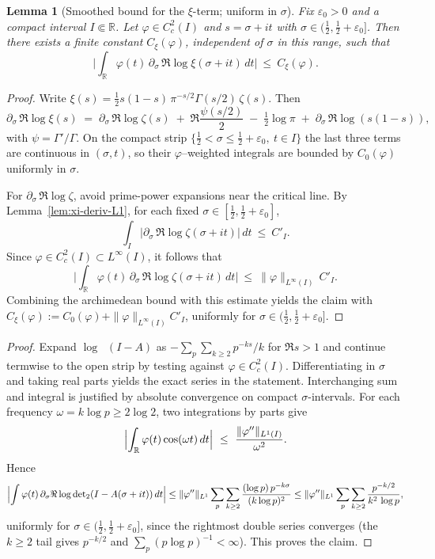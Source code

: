 \documentclass[11pt]{article}
\newtheorem{lemma}[theorem]{Lemma}
\theoremstyle{definition}
\theoremstyle{remark}
\newcommand{\R}{\mathbb{R}}
\DeclareMathOperator{\dettwo}{det_2}
\begin{document}
\begin{lemma}[Smoothed bound for the \(\xi\)-term; uniform in \(\sigma\)]\label{lem:xi-smoothed}
Fix \(\varepsilon_0>0\) and a compact interval \(I\Subset\R\). Let \(\varphi\in C_c^2(I)\) and \(s=\sigma+it\) with \(\sigma\in(\tfrac12,\tfrac12+\varepsilon_0]\). Then there exists a finite constant \(C_\xi(\varphi)\), independent of \(\sigma\) in this range, such that
\[
 \Big|\int_{\R}\varphi(t)\,\partial_\sigma\,\Re\log\xi(\sigma+it)\,dt\Big|\ \le\ C_\xi(\varphi).
\]
\end{lemma}
\begin{proof}
Write \(\xi(s)=\tfrac12 s(1-s)\,\pi^{-s/2}\Gamma(s/2)\,\zeta(s)\). Then
\[
 \partial_\sigma\,\Re\log\xi(s)\;=\;\partial_\sigma\,\Re\log\zeta(s)\; +\; \Re\frac{\psi(s/2)}{2}\; -\; \tfrac12\log\pi\; +\; \partial_\sigma\,\Re\log(s(1-s)),
\]
with \(\psi=\Gamma'/\Gamma\). On the compact strip \(\{\tfrac12<\sigma\le\tfrac12+\varepsilon_0,\ t\in I\}\) the last three terms are continuous in \((\sigma,t)\), so their \(\varphi\)–weighted integrals are bounded by \(C_0(\varphi)\) uniformly in \(\sigma\).

For \(\partial_\sigma\,\Re\log\zeta\), avoid prime-power expansions near the critical line. By Lemma~\ref{lem:xi-deriv-L1}, for each fixed \(\sigma\in[\tfrac12,\tfrac12+\varepsilon_0]\),
\[
 \int_I \Big|\partial_\sigma\,\Re\log\zeta(\sigma+it)\Big|\,dt\ \le\ C'_I.
\]
Since \(\varphi\in C_c^2(I)\subset L^\infty(I)\), it follows that
\[
 \Big|\int_{\R}\varphi(t)\,\partial_\sigma\,\Re\log\zeta(\sigma+it)\,dt\Big|\ \le\ \|\varphi\|_{L^\infty(I)}\,C'_I.
\]
Combining the archimedean bound with this estimate yields the claim with \(C_\xi(\varphi):=C_0(\varphi)+\|\varphi\|_{L^\infty(I)}C'_I\), uniformly for \(\sigma\in(\tfrac12,\tfrac12+\varepsilon_0]\).
\end{proof}
\begin{proof}
Expand \(\log\dettwo(I-A)\) as \(-\sum_{p}\sum_{k\ge2}p^{-ks}/k\) for \(\Re s>1\) and continue termwise to the open strip by testing against \(\varphi\in C_c^2(I)\). Differentiating in \(\sigma\) and taking real parts yields the exact series in the statement. Interchanging sum and integral is justified by absolute convergence on compact \(\sigma\)-intervals.
For each frequency \(\omega=k\log p\ge 2\log 2\), two integrations by parts give
\[
\Bigl|\int_{\R}\varphi(t)\cos(\omega t)\,dt\Bigr|\ \le\ \frac{\|\varphi''\|_{L^1(I)}}{\omega^2}.
\]
Hence
\[
\Bigl|\int \varphi(t)\,\partial_\sigma\Re\log\dettwo(I-A(\sigma+it))\,dt\Bigr|
\le \|\varphi''\|_{L^1}\sum_{p}\sum_{k\ge2}\frac{(\log p)\,p^{-k\sigma}}{(k\log p)^2}
\le \|\varphi''\|_{L^1}\sum_{p}\sum_{k\ge2}\frac{p^{-k/2}}{k^2\,\log p},
\]
uniformly for \(\sigma\in(\tfrac12,\tfrac12+\varepsilon_0]\), since the rightmost double series converges (the \(k\ge2\) tail gives \(p^{-k/2}\) and \(\sum_{p}(p\log p)^{-1}<\infty\)). This proves the claim.
\end{proof}
\end{document}
